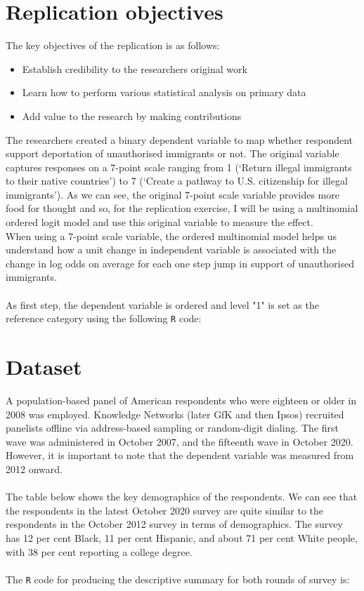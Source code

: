 \documentclass[12pt,letterpaper]{article}
\begin{document}
\section*{Replication objectives}
The key objectives of the replication is as follows:
\begin{itemize}
	\item Establish credibility to the researchers original work
	\item Learn how to perform various statistical analysis on primary data
	\item Add value to the research by making contributions
\end{itemize}
The researchers created a binary dependent variable to map whether respondent support deportation of unauthorised immigrants or not. The original variable captures responses on a 7-point scale ranging from 1 (‘Return illegal immigrants to their native countries’) to 7 (‘Create a pathway to U.S. citizenship for illegal immigrants’). As we can see, the original 7-point scale variable provides more food for thought and so, for the replication exercise, I will be using a multinomial ordered logit model and use this original variable to measure the effect.\\
When using a 7-point scale variable, the ordered multinomial model helps us understand how a unit change in independent variable is associated with the change in log odds on average for each one step jump in support of unauthorised immigrants.\\
\\As first step, the dependent variable is ordered and level "1" is set as the reference category using the following \texttt{R} code:
  

\vspace*{.2cm}

\section*{Dataset}
A population-based panel of American respondents who were eighteen or older in 2008 was employed. Knowledge Networks (later GfK and then Ipsos) recruited panelists offline via address-based sampling or random-digit dialing. The first wave was administered in October 2007, and
the fifteenth wave in October 2020. However, it is important to note that the dependent variable was measured from 2012 onward.\\
\\The table below shows the key demographics of the respondents. We can see that the respondents in the latest October 2020 survey are quite similar to the respondents in the October 2012 survey in terms of demographics. The survey has 12 per cent Black, 11 per cent Hispanic, and about 71 per cent White people, with 38 per cent reporting a college degree.\\
\\The \texttt{R} code for producing the descriptive summary for both rounds of survey is:

\end{document}
